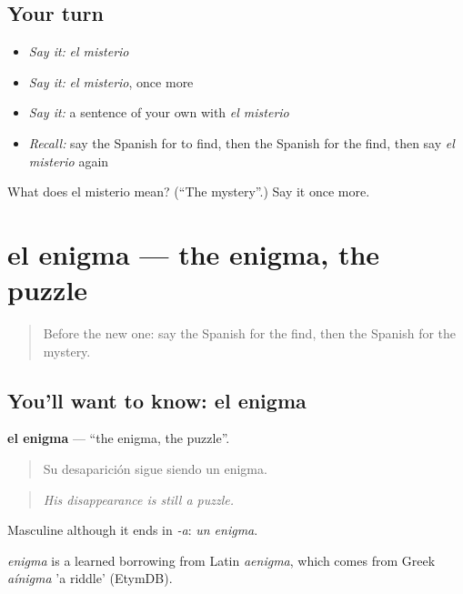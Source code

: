 \subsection*{Your turn}
\begin{itemize}
\raggedright
  \item \emph{Say it:} \emph{el misterio}
  \item \emph{Say it:} \emph{el misterio}, once more
  \item \emph{Say it:} a sentence of your own with \emph{el misterio}
  \item \emph{Recall:} say the Spanish for to find, then the Spanish for the find, then say \emph{el misterio} again
\end{itemize}

\begin{tcolorbox}[breakable,colback=teal!4,colframe=teal!35!black,title={Before you move on}]
What does el misterio mean? (\textquotedblleft{}The mystery\textquotedblright{}.) Say it once more.
\end{tcolorbox}
\section[el enigma]{el enigma — the enigma, the puzzle}

\label{lesson:ES-C532-enigma}



\begin{quote}
Before the new one: say the Spanish for the find, then the Spanish for the mystery.
\end{quote}

\subsection*{You'll want to know: el enigma}
\textbf{el enigma} — \textquotedblleft{}the enigma, the puzzle\textquotedblright{}.

\begin{quote}
Su desaparición sigue siendo un enigma.
\end{quote}

\begin{quote}
\emph{His disappearance is still a puzzle.}
\end{quote}

Masculine although it ends in \emph{-a}: \emph{un enigma}.

\begin{cousinweb}
\emph{enigma} is a learned borrowing from Latin \emph{aenigma}, which comes from Greek \emph{aínigma} 'a riddle' (EtymDB).
\end{cousinweb}

